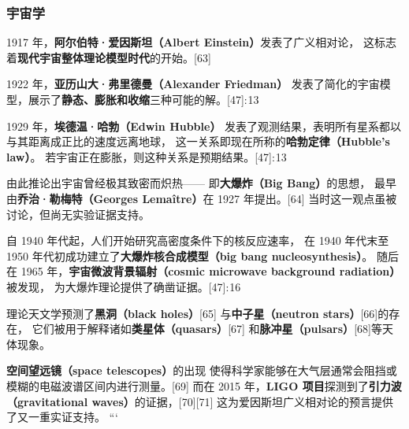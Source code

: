 \subsubsection{宇宙学}


1917 年，\textbf{阿尔伯特·爱因斯坦（Albert Einstein）}发表了广义相对论，  
这标志着\textbf{现代宇宙整体理论模型时代}的开始。[63]  

1922 年，\textbf{亚历山大·弗里德曼（Alexander Friedman）}  
发表了简化的宇宙模型，展示了\textbf{静态、膨胀和收缩}三种可能的解。[47]: 13   

1929 年，\textbf{埃德温·哈勃（Edwin Hubble）}  
发表了观测结果，表明所有星系都以与其距离成正比的速度远离地球，  
这一关系即现在所称的\textbf{哈勃定律（Hubble’s law）}。  
若宇宙正在膨胀，则这种关系是预期结果。[47]: 13   

由此推论出宇宙曾经极其致密而炽热——  
即\textbf{大爆炸（Big Bang）}的思想，  
最早由\textbf{乔治·勒梅特（Georges Lemaître）}在 1927 年提出。[64]  
当时这一观点虽被讨论，但尚无实验证据支持。  

自 1940 年代起，人们开始研究高密度条件下的核反应速率，  
在 1940 年代末至 1950 年代初成功建立了\textbf{大爆炸核合成模型（big bang nucleosynthesis）}。  
随后在 1965 年，\textbf{宇宙微波背景辐射（cosmic microwave background radiation）}被发现，  
为大爆炸理论提供了确凿证据。[47]: 16   

理论天文学预测了\textbf{黑洞（black holes）}[65]  
与\textbf{中子星（neutron stars）}[66]的存在，  
它们被用于解释诸如\textbf{类星体（quasars）}[67]  
和\textbf{脉冲星（pulsars）}[68]等天体现象。  

\textbf{空间望远镜（space telescopes）}的出现  
使得科学家能够在大气层通常会阻挡或模糊的电磁波谱区间内进行测量。[69]  
而在 2015 年，\textbf{LIGO 项目}探测到了\textbf{引力波（gravitational waves）}的证据，[70][71]  
这为爱因斯坦广义相对论的预言提供了又一重实证支持。
```
